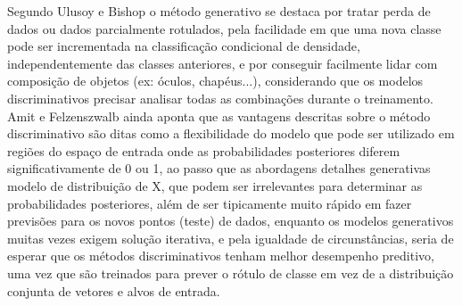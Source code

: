 Segundo Ulusoy e Bishop\cite{Ulusoy:2005} o método generativo se destaca por tratar perda de dados ou dados parcialmente rotulados, pela facilidade em que uma nova classe pode ser incrementada na classificação condicional de densidade, independentemente das classes anteriores, e por conseguir facilmente lidar com composição de objetos (ex: óculos, chapéus...), considerando que os modelos discriminativos precisar analisar todas as combinações durante o treinamento. Amit e Felzenszwalb\cite{AmitFelzenszwalb:2014} ainda aponta que as vantagens descritas sobre o método discriminativo são ditas como a flexibilidade do modelo  que pode ser utilizado em regiões do espaço de entrada onde as probabilidades posteriores diferem significativamente de 0 ou 1, ao passo que as abordagens detalhes generativas modelo de distribuição de X, que podem ser irrelevantes para determinar as probabilidades posteriores, além de ser tipicamente muito rápido em fazer previsões para os novos pontos (teste) de dados, enquanto os modelos generativos muitas vezes exigem solução iterativa, e pela igualdade de circunstâncias, seria de esperar que os métodos discriminativos tenham melhor desempenho preditivo, uma vez que são treinados para prever o rótulo de classe em vez de a distribuição conjunta de vetores e alvos de entrada.

